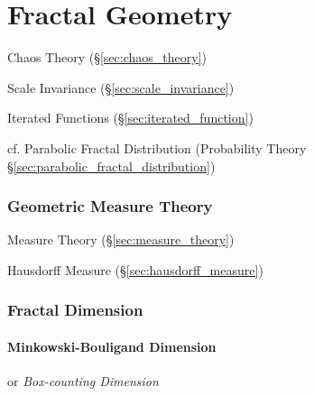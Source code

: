 \part{Fractal Geometry}\label{sec:fractal_geometry}

Chaos Theory (\S\ref{sec:chaos_theory})

Scale Invariance (\S\ref{sec:scale_invariance})

Iterated Functions (\S\ref{sec:iterated_function})

cf. Parabolic Fractal Distribution (Probability Theory
\S\ref{sec:parabolic_fractal_distribution})



\section{Geometric Measure Theory}\label{sec:geometric_measure_theory}

\fist Measure Theory (\S\ref{sec:measure_theory})

\fist Hausdorff Measure (\S\ref{sec:hausdorff_measure})



\section{Fractal Dimension}\label{sec:fractal_dimension}

\subsection{Minkowski-Bouligand Dimension}
\label{sec:minkowski_bouligand}

or \emph{Box-counting Dimension}



